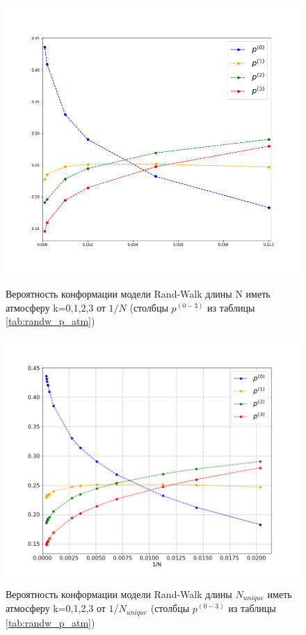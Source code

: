 \begin{figure}[h]
    
\begin{minipage}{0.49\textwidth}
\centering
\includegraphics[width=\textwidth]{Sections/Images_2/randwalk_p_atmos.png}
\caption{Вероятность конформации модели Rand-Walk длины N иметь атмосферу k=0,1,2,3 от $1/N$  (столбцы $p^{(0-3)}$ из таблицы \ref{tab:randw_p_atm})}
\label{fig:randw_p_atm}
\end{minipage}
\hfill
\begin{minipage}{0.49\textwidth}
\centering
\includegraphics[width=\textwidth]{Sections/Images_2/randwalk_p_atmos_unique.png}
\caption{Вероятность конформации модели Rand-Walk длины $N_{unique}$ иметь атмосферу k=0,1,2,3 от $1/N_{unique}$  (столбцы $p^{(0-3)}$ из таблицы \ref{tab:randw_p_atm})}
\label{fig:randw_p_atm_u}
\end{minipage}
\end{figure} 

